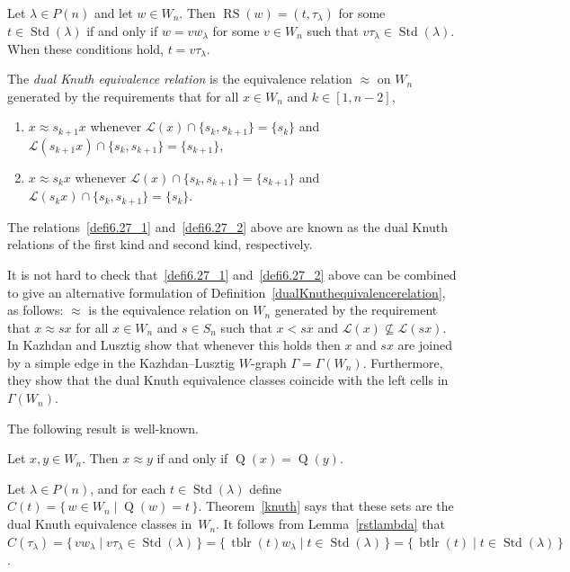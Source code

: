 \documentclass[ALCO,ThmDefs,Unicode,epreuves]{cedram}
\DeclareMathOperator{\perm}{tblr}
\DeclareMathOperator{\word}{btlr}
\newcommand{\citex}[2]{\cite[#1]{#2}}
\DeclareMathOperator{\STD}{Std}
\DeclareMathOperator{\RS}{RS}
\DeclareMathOperator{\RSQ}{Q}
\begin{document}
\begin{lemm}[{\citex{Lemma~6.3}{nguyen:wgideals2}}]\label{rstlambda}
Let $\lambda\in P(n)$ and let $w\in W_n$. Then
$\RS(w)=(t,\tau_\lambda)$ for some $t\in\STD(\lambda)$ if and
only if $w=vw_{\lambda}$ for some $v\in W_n$ such that
$v\tau_\lambda\in\STD(\lambda)$. When these conditions hold,
$t=v\tau_\lambda$.
\end{lemm}

\begin{defi}\label{dualKnuthequivalencerelation}
The \emph{dual Knuth equivalence relation} is the equivalence relation $\approx$
on $W_n$ generated by the requirements that for all $x\in W_n$ and
$k \in [1,n-2]$,
\begin{enumerate}[label=(\arabic*),topsep=1 pt]
\item\label{defi6.27_1} $x\approx s_{k+1}x$ whenever $\mathcal{L}(x)\cap\{s_{k},s_{k+1}\}=\{s_{k}\}$
and $\mathcal{L}(s_{k+1}x)\cap\{s_k,s_{k+1}\}=\{s_{k+1}\}$,
\item\label{defi6.27_2} $x\approx s_kx$ whenever $\mathcal{L}(x)\cap\{s_{k},s_{k+1}\} = \{s_{k+1}\}$
and $\mathcal{L}(s_kx)\cap\{s_k,s_{k+1}\}=\{s_{k}\}$.
\end{enumerate}
\end{defi}
The relations~\ref{defi6.27_1} and~\ref{defi6.27_2} above are known as the dual Knuth relations of
the first kind and second kind, respectively.

\begin{rema}\label{altDualKnuth}
It is not hard to check that~\ref{defi6.27_1} and~\ref{defi6.27_2} above can be combined to give an
alternative formulation of Definition~\ref{dualKnuthequivalencerelation},
as follows: $\approx$ is the equivalence relation on $W_n$ generated by
the requirement that $x\approx sx$ for all $x\in W_n$ and $s\in S_n$
such that $x<sx$ and $\mathcal{L}(x)\nsubseteq\mathcal{L}(sx)$.
In \cite{kazlus:coxhecke} Kazhdan and Lusztig show that whenever this
holds then $x$ and $sx$ are joined by a simple
edge in the Kazhdan--Lusztig $W$-graph $\Gamma=\Gamma(W_n)$. Furthermore,
they show that the dual Knuth equivalence classes coincide with the
left cells in $\Gamma(W_n)$.
\end{rema}
The following result is well-known.

\begin{theo}[{\citex{Theorem~3.6.10}{sag:sym}}]\label{knuth}
Let $x,y \in W_n$. Then $x\approx y$ if and only if $\RSQ(x)=\RSQ(y)$.
\end{theo}
Let $\lambda\in P(n)$, and for each $t\in\STD(\lambda)$
define $C(t)=\{\,w\in W_n \mid \RSQ(w)=t\,\}$. Theorem~\ref{knuth} says
that these sets are the dual Knuth equivalence classes in~$W_n$. It follows
from Lemma~\ref{rstlambda} that
$C(\tau_\lambda)=\{\,vw_{\lambda} \mid v\tau_\lambda\in\STD(\lambda)\,\}
=\{\,\perm(t)w_{\lambda}\mid t\in\STD(\lambda)\,\}
=\{\,\word(t)\mid t\in\STD(\lambda)\,\}$.
\end{document}
